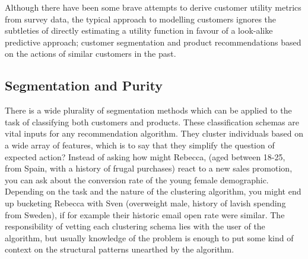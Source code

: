 \documentclass{tufte-handout}
\begin{document}
\noindent Although there have been some brave attempts to derive customer utility metrics from survey data, the typical approach to modelling customers ignores the subtleties of directly estimating a utility function in favour of a look-alike predictive approach; customer segmentation and product recommendations based on the actions of similar customers in the past. 

\subsection{Segmentation and Purity}
There is a wide plurality of segmentation methods which can be applied to the task of classifying both customers and products. These classification schemas are vital inputs for any recommendation algorithm. They cluster individuals based on a wide array of features, which is to say that they simplify the question of expected action? Instead of asking how might Rebecca, (aged between 18-25, from Spain, with a history of frugal purchases) react to a new sales promotion, you can ask about the conversion rate of the young female demographic. Depending on the task and the nature of the clustering algorithm, you might end up bucketing Rebecca with Sven (overweight male, history of lavish spending from Sweden), if for example their historic email open rate were similar. The responsibility of vetting each clustering schema lies with the user of the algorithm, but usually knowledge of the problem is enough to put some kind of context on the structural patterns unearthed by the algorithm. 





\end{document}
